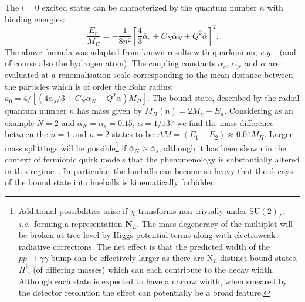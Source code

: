 The $l=0$ excited states can be characterized by the quantum number $n$ with
binding energies:
\begin{equation}
  \frac{E_n}{M_\Pi} = - \frac{1}{8n^2} \left[ \frac{4}{3} \bar{\alpha}_{s} + C_{N} \bar{\alpha}_{N} + Q^2 \bar{\alpha} \right]^2.
  \label{eq:8y}
\end{equation}
The above formula was adapted from known results with quarkonium, \textit{e.g.}\
\cite{Kats:2016kuz} (and of course also the hydrogen atom). The coupling
constants $\bar{\alpha}_{s}$, $\bar{\alpha}_{N}$ and $\bar{\alpha}$ are
evaluated at a renomalisation scale corresponding to the mean distance between
the particles which is of order the Bohr radius:
$a_0 = 4/[(4\bar{\alpha}_{s}/3 + C_{N}\bar{\alpha}_{N} + Q^2 \bar{\alpha})M_\Pi]$.
The bound state, described by the radial quantum number $n$ has mass given by
$M_\Pi(n) = 2M_\chi + E_n$. Considering as an example $N=2$ and
$\bar{\alpha}_{N} = \bar{\alpha}_{s} = 0.15$, $\bar{\alpha} = 1/137$ we find the
mass difference between the $n=1$ and $n=2$ states to be
$\Delta M = (E_1-E_2) \approx 0.01 M_\Pi$. Larger mass splittings will be
possible\footnote{Additional possibilities arise if $\chi$ transforms
  non-trivially under $\mathrm{SU}(2)_{L}$, \textit{i.e.}\ forming a
  representation $\mathbf{N}_{L}$. The mass degeneracy of the multiplet will be
  broken at tree-level by Higgs potential terms along with electroweak radiative
  corrections. The net effect is that the predicted width of the
  $pp \rightarrow \gamma \gamma$ bump can be effectively larger as there are
  $\mathrm{N}_{L}$ distinct bound states, $\Pi^i$, (of differing masses) which
  can each contribute to the decay width. Although each state is expected to
  have a narrow width, when smeared by the detector resolution the effect can
  potentially be a broad feature.} if $\bar{\alpha}_{N} > \bar{\alpha}_{s}$,
although it has been shown in the context of fermionic quirk models that the
phenomenology is substantially altered in this regime~\cite{Curtin:2015jcv}. In
particular, the hueballs can become so heavy that the decays of the bound state
into hueballs is kinematically forbidden.

